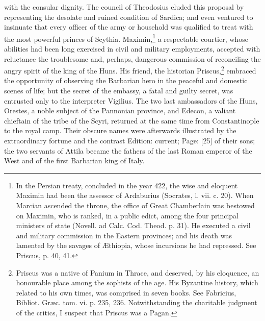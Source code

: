 with the consular dignity. The council of Theodosius eluded this proposal by representing the desolate and ruined condition of Sardica; and even ventured to insinuate that every officer of the army or household was qualified to treat with the most powerful princes of Scythia. Maximin,\footnote{In the Persian treaty, concluded in the year 422, the wise and eloquent Maximin had been the assessor of Ardaburius (Socrates, l. vii. c. 20). When Marcian ascended the throne, the office of Great Chamberlain was bestowed on Maximin, who is ranked, in a public edict, among the four principal ministers of state (Novell. ad Calc. Cod. Theod. p. 31). He executed a civil and military commission in the Eastern provinces; and his death was lamented by the savages of Æthiopia, whose incursions he had repressed. See Priscus, p. 40, 41.} a respectable courtier, whose abilities had been long exercised in civil and military employments, accepted with reluctance the troublesome and, perhaps, dangerous commission of reconciling the angry spirit of the king of the Huns. His friend, the historian Priscus,\footnote{Priscus was a native of Panium in Thrace, and deserved, by his eloquence, an honourable place among the sophists of the age. His Byzantine history, which related to his own times, was comprised in seven books. See Fabricius, Bibliot. Græc. tom. vi. p. 235, 236. Notwithstanding the charitable judgment of the critics, I suspect that Priscus was a Pagan.} embraced the opportunity of observing the Barbarian hero in the peaceful and domestic scenes of life; but the secret of the embassy, a fatal and guilty secret, was entrusted only to the interpreter Vigilius. The two last ambassadors of the Huns, Orestes, a noble subject of the Pannonian province, and Edecon, a valiant chieftain of the tribe of the Scyri, returned at the same time from Constantinople to the royal camp. Their obscure names were afterwards illustrated by the extraordinary fortune and the contrast Edition: current; Page: [25] of their sons; the two servants of Attila became the fathers of the last Roman emperor of the West and of the first Barbarian king of Italy.


